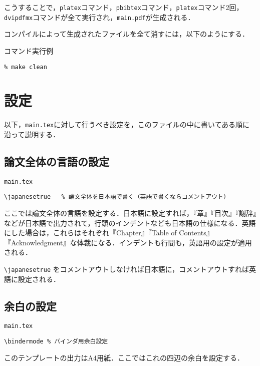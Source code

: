 こうすることで，\verb|platex|コマンド，\verb|pbibtex|コマンド，\verb|platex|コマンド2回，\verb|dvipdfmx|コマンドが全て実行され，{\tt main.pdf}が生成される．

コンパイルによって生成されたファイルを全て消すには，以下のようにする．

\begin{itembox}[l]{コマンド実行例}
\begin{verbatim}
% make clean
\end{verbatim}
\end{itembox}

\section{設定}

以下，{\tt main.tex}に対して行うべき設定を，このファイルの中に書いてある順に沿って説明する．

\subsection{論文全体の言語の設定}
\label{sec:lang}

\begin{itembox}[l]{{\tt main.tex}}
\begin{verbatim}
\japanesetrue	% 論文全体を日本語で書く（英語で書くならコメントアウト）
\end{verbatim}
\end{itembox}

ここでは論文全体の言語を設定する．日本語に設定すれば，『章』『目次』『謝辞』などが日本語で出力されて，行頭のインデントなども日本語の仕様になる．英語にした場合は，これらはそれぞれ『Chapter』『Table of Contents』『Acknowledgment』な体裁になる．インデントも行間も，英語用の設定が適用される．

\verb|\japanesetrue| をコメントアウトしなければ日本語に，コメントアウトすれば英語に設定される．


\subsection{余白の設定}

\begin{itembox}[l]{{\tt main.tex}}
\begin{verbatim}
\bindermode	% バインダ用余白設定
\end{verbatim}
\end{itembox}

このテンプレートの出力はA4用紙．ここではこれの四辺の余白を設定する．

